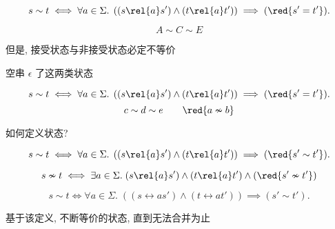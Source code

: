 \begin{frame}{}
  \[
    s \sim t \iff \forall a \in \Sigma.\;
      \left((s \rel{a} s') \land (t \rel{a} t')\right) \implies (\red{s' = t'}).
  \]


  \vspace{-0.30cm}
  \[
    A \sim C \sim E
  \]

  \pause
  \vspace{0.20cm}
  \begin{center}
    但是, 接受状态与非接受状态必定不等价

    \vspace{0.30cm}
    空串 $\epsilon$ 了这两类状态
  \end{center}
\end{frame}

\begin{frame}{}
  \[
    s \sim t \iff \forall a \in \Sigma.\;
      \left((s \rel{a} s') \land (t \rel{a} t')\right) \implies (\red{s' = t'}).
  \]
  \[
    c \sim d \sim e \qquad \red{a \nsim b}
  \]
  \pause
\end{frame}

\begin{frame}{}
  \begin{center}
    如何定义状态?
  \end{center}


  \[
    s \sim t \iff \forall a \in \Sigma.\;
      \left((s \rel{a} s') \land (t \rel{a} t')\right) \implies (\red{s' \sim t'}).
  \]

  \pause
  \[
    s \nsim t \iff \exists a \in \Sigma.\;
      (s \rel{a} s') \land (t \rel{a} t') \land (\red{s' \nsim t'})
  \]
\end{frame}

\begin{frame}{}
  \begin{center}
    \[
      s \sim t \iff \forall a \in \Sigma.\;
        \left((s \rel{a} s') \land (t \rel{a} t')\right) \implies (s' \sim t').
    \]

    基于该定义, 不断等价的状态, 直到无法合并为止

    \pause
    \vspace{0.80cm}

    \pause
    \vspace{0.80cm}

    \pause
    \vspace{0.50cm}
  \end{center}
\end{frame}

